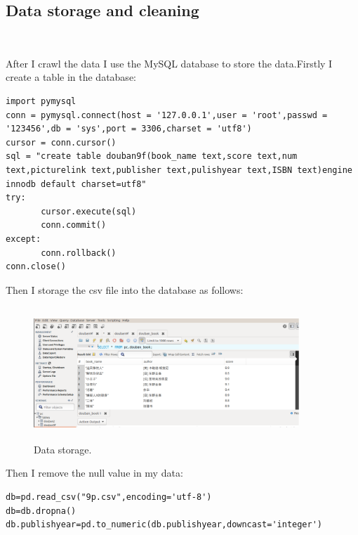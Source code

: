 \documentclass[12pt, a4paper]{article}
\begin{document}
\subsection{Data storage and cleaning}　　　　　　　　　　　　　　　　　　　　　　　　　　　　　　　　　　　　　　　　　　　　　　　　　　　　　　　　　　　　　　　　　　　　　　　　　　　　　　　　　　　　　　　　　　　　　　　　　　　　　　　　　　　　　　　　　　　　　　　　　　　　　　　　　　　　　　　　　　　　　　　　　　　　　　　　　　　　　　　　　　　　　　　　　　　　　　　　　　　　　　　　　　

After I crawl the data I use the MySQL database to store 
the data.Firstly I create a table in the database:
\newpage{}
\lstset{language=Python}
\begin{lstlisting}[caption={Creat table}]
import pymysql
conn = pymysql.connect(host = '127.0.0.1',user = 'root',passwd = '123456',db = 'sys',port = 3306,charset = 'utf8') 
cursor = conn.cursor()
sql = "create table douban9f(book_name text,score text,num text,picturelink text,publisher text,pulishyear text,ISBN text)engine innodb default charset=utf8"
try:
       cursor.execute(sql)
       conn.commit()
except:
       conn.rollback()
conn.close()

\end{lstlisting}


Then I storage the csv file into the database as follows:


\begin{figure}[ht]
    \centering
    \includegraphics[width=10cm,height=5cm]{p2.png}
    \caption{Data storage.}
\end{figure}



\newpage{}
   
Then I remove the null value in my data:
\lstset{language=Python}
\begin{lstlisting}[caption={Remove the null value}]
db=pd.read_csv("9p.csv",encoding='utf-8')
db=db.dropna()
db.publishyear=pd.to_numeric(db.publishyear,downcast='integer')

\end{lstlisting}
\end{document}
